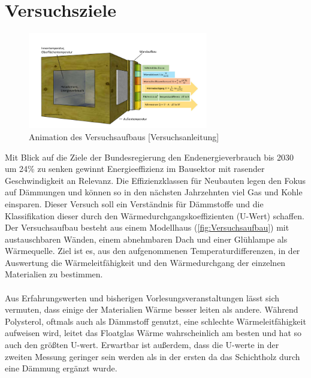 \section{Versuchsziele}
\begin{figure}[!h]
		\centering
		\includegraphics[width=0.7\textwidth]{Abbildungen/Thurow_Deckblatt}
		\caption{Animation des Versuchsaufbaus [Versuchsanleitung] }
		\label{fig:Versuchsaufbau}
\end{figure}

Mit Blick auf die Ziele der Bundesregierung den Endenergieverbrauch bis 2030 um 24\% zu senken gewinnt Energieeffizienz im Bausektor mit rasender Geschwindigkeit an Relevanz. Die Effizienzklassen für Neubauten legen den Fokus auf Dämmungen und können so in den nächsten Jahrzehnten viel Gas und Kohle einsparen. Dieser Versuch soll ein Verständnis für Dämmstoffe und die Klassifikation dieser durch den Wärmedurchgangskoeffizienten (U-Wert) schaffen.  Der Versuchsaufbau besteht aus einem Modellhaus (\autoref{fig:Versuchsaufbau}) mit austauschbaren Wänden, einem abnehmbaren Dach und einer Glühlampe als Wärmequelle. Ziel ist es, aus den aufgenommenen Temperaturdifferenzen, in der Auswertung die Wärmeleitfähigkeit und den Wärmedurchgang der einzelnen Materialien zu bestimmen.\\\\
Aus Erfahrungswerten und bisherigen Vorlesungsveranstaltungen lässt sich vermuten, dass einige der Materialien Wärme besser leiten als andere. Während Polysterol, oftmals auch als Dämmstoff genutzt, eine schlechte Wärmeleitfähigkeit aufweisen wird, leitet das Floatglas Wärme wahrscheinlich am besten und hat so auch den größten U-wert. Erwartbar ist außerdem, dass die U-werte in der zweiten Messung geringer sein werden als in der ersten da das Schichtholz durch eine Dämmung ergänzt wurde.